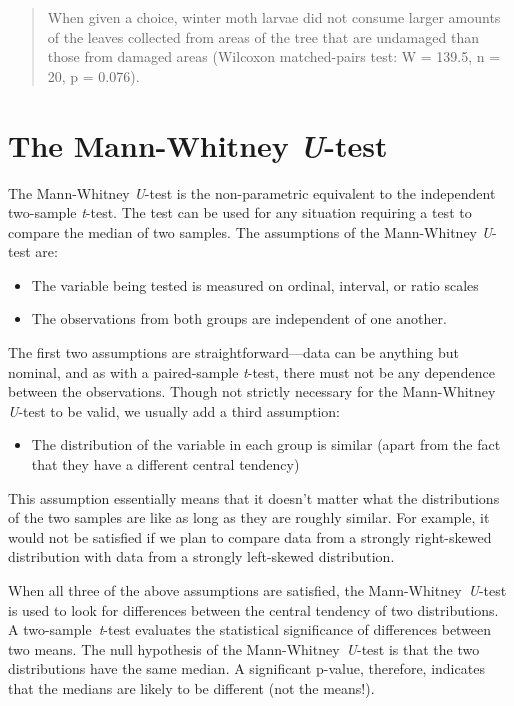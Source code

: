 \documentclass[
]{book}
\providecommand{\tightlist}{%
  \setlength{\itemsep}{0pt}\setlength{\parskip}{0pt}}
\begin{document}
\begin{quote}
When given a choice, winter moth larvae did not consume larger amounts of the leaves collected from areas of the tree that are undamaged than those from damaged areas (Wilcoxon matched-pairs test: W = 139.5, n = 20, p = 0.076).
\end{quote}

\hypertarget{mann-whitney}{%
\section{\texorpdfstring{The Mann-Whitney \emph{U}-test}{The Mann-Whitney U-test}}\label{mann-whitney}}

The Mann-Whitney \emph{U}-test is the non-parametric equivalent to the independent two-sample \emph{t}-test. The test can be used for any situation requiring a test to compare the median of two samples. The assumptions of the Mann-Whitney \emph{U}-test are:

\begin{itemize}
\tightlist
\item
  The variable being tested is measured on ordinal, interval, or ratio scales
\item
  The observations from both groups are independent of one another.
\end{itemize}

The first two assumptions are straightforward---data can be anything but nominal, and as with a paired-sample \emph{t}-test, there must not be any dependence between the observations. Though not strictly necessary for the Mann-Whitney \emph{U}-test to be valid, we usually add a third assumption:

\begin{itemize}
\tightlist
\item
  The distribution of the variable in each group is similar (apart from the fact that they have a different central tendency)
\end{itemize}

This assumption essentially means that it doesn't matter what the distributions of the two samples are like as long as they are roughly similar. For example, it would not be satisfied if we plan to compare data from a strongly right-skewed distribution with data from a strongly left-skewed distribution.

When all three of the above assumptions are satisfied, the Mann-Whitney~\emph{U}-test is used to look for differences between the central tendency of two distributions. A two-sample~\emph{t}-test evaluates the statistical significance of differences between two means. The null hypothesis of the Mann-Whitney~\emph{U}-test is that the two distributions have the same median. A significant p-value, therefore, indicates that the medians are likely to be different (not the means!).
\end{document}
